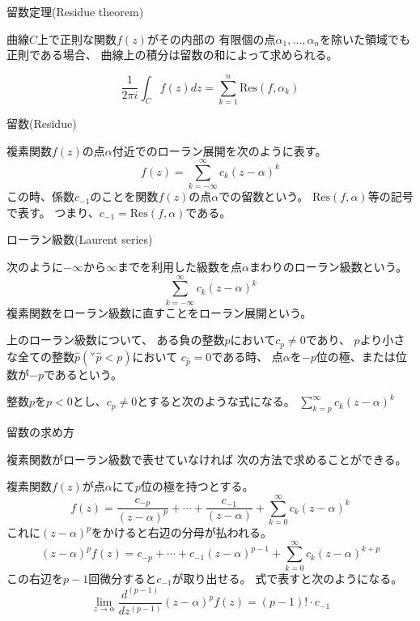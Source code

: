 \documentclass[10pt,b5paper]{ltjsarticle}
\begin{document}
留数定理(Residue theorem)

曲線$C$上で正則な関数$f(z)$がその内部の
有限個の点$\alpha_{1},\dots ,\alpha_{n}$を除いた領域でも
正則である場合、
曲線上の積分は留数の和によって求められる。

\begin{equation}
 \frac{1}{2\pi i}\int_{C}f(z)dz = \sum_{k=1}^{n}\mathrm{Res}(f,\alpha_{k})
\end{equation}

\hrulefill

留数(Residue)

複素関数$f(z)$の点$\alpha$付近でのローラン展開を次のように表す。
\begin{equation}
 f(z) = \sum_{k=-\infty}^{\infty} c_k (z-\alpha)^k
\end{equation}
この時、係数$c_{-1}$のことを関数$f(z)$の点$\alpha$での留数という。
$\mathrm{Res}(f,\alpha)$等の記号で表す。
つまり、$c_{-1} = \mathrm{Res}(f,\alpha)$である。

\hrulefill

ローラン級数(Laurent series)

次のように$-\infty$から$\infty$までを利用した級数を点$\alpha$まわりのローラン級数という。
\begin{equation}
 \sum_{k=-\infty}^{\infty} c_k (z-\alpha)^k
\end{equation}
複素関数をローラン級数に直すことをローラン展開という。


上のローラン級数について、
ある負の整数$p$において$c_{p}\ne 0$であり、
$p$より小さな全ての整数$\hat{p} ({}^\forall \hat{p}<p)$において
$c_{\hat{p}}=0$である時、
点$\alpha$を$-p$位の極、または位数が$-p$であるという。

整数$p$を$p<0$とし、$c_p\ne 0$とすると次のような式になる。
 $\sum_{k=p}^{\infty} c_k (z-\alpha)^k$


\hrulefill

留数の求め方

複素関数がローラン級数で表せていなければ
次の方法で求めることができる。

複素関数$f(z)$が点$\alpha$にて$p$位の極を持つとする。
\begin{equation}
 f(z)=\frac{c_{-p}}{(z-\alpha)^p}+\cdots +\frac{c_{-1}}{(z-\alpha)}
  + \sum_{k=0}^{\infty}c_k(z-\alpha)^k
\end{equation}
これに$(z-\alpha)^{p}$をかけると右辺の分母が払われる。
\begin{equation}
 (z-\alpha)^{p}f(z)=c_{-p}+ \cdots +c_{-1}(z-\alpha)^{p-1}
  + \sum_{k=0}^{\infty}c_k(z-\alpha)^{k+p}
\end{equation}
この右辺を$p-1$回微分すると$c_{-1}$が取り出せる。
式で表すと次のようになる。
\begin{equation}
 \lim_{z\rightarrow\alpha} \frac{d^{(p-1)}}{dz^{(p-1)}}(z-\alpha)^{p}f(z)
  = (p-1)!\cdot c_{-1}
\end{equation}
\end{document}
